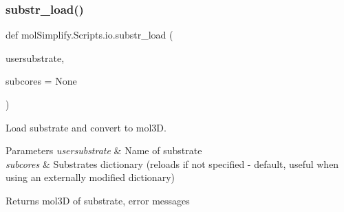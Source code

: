 \subsubsection{\texorpdfstring{substr\+\_\+load()}{substr\_load()}}
{\footnotesize\ttfamily def mol\+Simplify.\+Scripts.\+io.\+substr\+\_\+load (\begin{DoxyParamCaption}\item[{}]{usersubstrate,  }\item[{}]{subcores = {\ttfamily None} }\end{DoxyParamCaption})}



Load substrate and convert to mol3D. 


\begin{DoxyParams}{Parameters}
{\em usersubstrate} & Name of substrate \\
\hline
{\em subcores} & Substrates dictionary (reloads if not specified -\/ default, useful when using an externally modified dictionary) \\
\hline
\end{DoxyParams}
\begin{DoxyReturn}{Returns}
mol3D of substrate, error messages 
\end{DoxyReturn}
